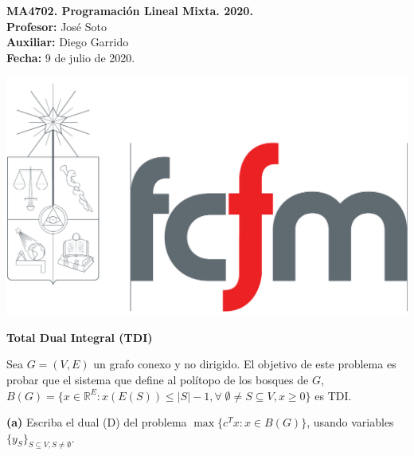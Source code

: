 \documentclass[10pt]{article}
\newcommand{\RR}{\mathbb R}
\theoremstyle{plain}
\theoremstyle{definition}
\newcommand{\sca}{Diego Garrido}
\newcommand{\fecha}{9 de julio  de 2020}
\begin{document}
\vspace*{-1.2 cm}
\begin{minipage}{0.6\textwidth}
\begin{flushleft}
\hspace*{-0.5cm}\textbf{MA4702. Programación Lineal Mixta. 2020.}\\
\hspace*{-0.5cm}\textbf{Profesor:} José Soto\\
\hspace*{-0.5cm}\textbf{Auxiliar:} \sca\\
\hspace*{-0.5cm}\textbf{Fecha:} \fecha.
\end{flushleft}
\end{minipage}
\begin{minipage}{0.36\textwidth}
\begin{flushright}
\includegraphics[scale=0.15]{fcfm}
\end{flushright}
\end{minipage}
\bigskip

\begin{center}
\LARGE\textbf{Total Dual Integral (TDI)}
\end{center}

Sea $G=(V,E)$ un grafo conexo y no dirigido. 
El objetivo de este problema es probar que el sistema que define al polítopo de los bosques de $G$,
$B(G)=\{x\in \RR^E\colon x(E(S))\leq |S|-1, \forall\; \emptyset\neq S\subseteq V, x\geq 0\}$ es TDI.

\hspace{-15pt}\textbf{(a)} 
Escriba el dual (D) del problema $\max\{c^Tx\colon x\in B(G)\}$, usando variables $\{y_S\}_{S\subseteq V, S\neq \emptyset}$.
\end{document}
